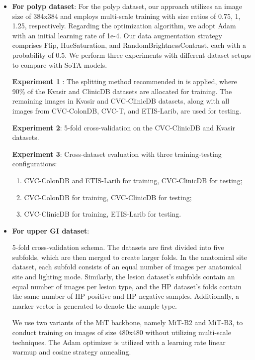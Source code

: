 \documentclass{article}
\begin{document}
\begin{itemize}
\item\textbf{For polyp dataset}: For the polyp dataset, our approach utilizes an image size of 384x384 and employs multi-scale training with size ratios of {0.75, 1, 1.25}, respectively. Regarding the optimization algorithm, we adopt Adam with an initial learning rate of 1e-4. Our data augmentation strategy comprises  Flip, HueSaturation, and RandomBrightnessContrast, each with a probability of 0.5. 
We perform three experiments with different dataset setups to compare with SoTA models.

\textbf{Experiment 1} \label{polyp:exp1}: The splitting method recommended in \cite{pranet} is applied, where 90\% of the Kvasir and ClinicDB datasets are allocated for training. The remaining images in Kvasir and CVC-ClinicDB datasets, along with all images from CVC-ColonDB, CVC-T, and ETIS-Larib, are used for testing.

\textbf{Experiment 2}: 5-fold cross-validation on the CVC-ClinicDB and Kvasir datasets.

\textbf{Experiment 3}: Cross-dataset evaluation with three training-testing configurations:
\begin{enumerate}
\item CVC-ColonDB and ETIS-Larib for training, CVC-ClinicDB for testing;
\item CVC-ColonDB for training, CVC-ClinicDB for testing;
\item CVC-ClinicDB for training, ETIS-Larib for testing.
\end{enumerate}
 

\item\textbf{For upper GI dataset}: 

5-fold cross-validation schema. The datasets are first divided into five subfolds, which are then merged to create larger folds. In the anatomical site dataset, each subfold consists of an equal number of images per anatomical site and lighting mode. Similarly, the lesion dataset's subfolds contain an equal number of images per lesion type, and the HP dataset's folds contain the same number of HP positive and HP negative samples. Additionally, a marker vector  is generated to denote the sample type.

We use two variants of the MiT backbone, namely MiT-B2 and MiT-B3, to conduct training on images of size 480x480 without utilizing multi-scale techniques. The Adam optimizer is utilized with a learning rate linear warmup and cosine strategy annealing. 


\end{itemize}
\end{document}
